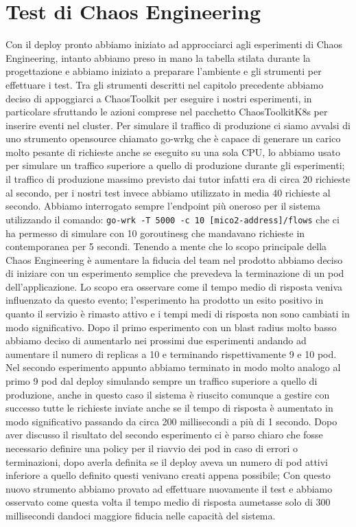 \section{Test di Chaos Engineering}
Con il deploy pronto abbiamo iniziato ad approcciarci agli esperimenti di Chaos Engineering, intanto abbiamo preso in mano la tabella stilata durante la progettazione e abbiamo iniziato a preparare l'ambiente e gli strumenti per effettuare i test.
Tra gli strumenti descritti nel capitolo precedente abbiamo deciso di appoggiarci a ChaosToolkit per eseguire i nostri esperimenti, in particolare sfruttando le azioni comprese nel pacchetto ChaosToolkitK8s per inserire eventi nel cluster.
Per simulare il traffico di produzione ci siamo avvalsi di uno strumento opensource chiamato \gls{go-wrkg} che è capace di generare un carico molto pesante di richieste anche se eseguito su una sola CPU, lo abbiamo usato per simulare un traffico superiore a quello di produzione durante gli esperimenti; il traffico di produzione massimo previsto dai tutor infatti era di circa 20 richieste al secondo, per i nostri test invece abbiamo utilizzato in media 40 richieste al secondo.
Abbiamo interrogato sempre l'endpoint più oneroso per il sistema utilizzando il comando:
\texttt{go-wrk -T 5000 -c 10 [mico2-address]/flows}
che ci ha permesso di simulare con 10 \gls{goroutinesg} che mandavano richieste in contemporanea per 5 secondi.
Tenendo a mente che lo scopo principale della Chaos Engineering è aumentare la fiducia del team nel prodotto abbiamo deciso di iniziare con un esperimento semplice che prevedeva la terminazione di un pod dell'applicazione.
Lo scopo era osservare come il tempo medio di risposta veniva influenzato da questo evento; l'esperimento ha prodotto un esito positivo in quanto il servizio è rimasto attivo e i tempi medi di risposta non sono cambiati in modo significativo.
Dopo il primo esperimento con un blast radius molto basso abbiamo deciso di aumentarlo nei prossimi due esperimenti andando ad aumentare il numero di replicas a 10 e terminando rispettivamente 9 e 10 pod.
Nel secondo esperimento appunto abbiamo terminato in modo molto analogo al primo 9 pod dal deploy simulando sempre un traffico superiore a quello di produzione, anche in questo caso il sistema è riuscito comunque a gestire con successo tutte le richieste inviate anche se il tempo di risposta è aumentato in modo significativo passando da circa 200 millisecondi a più di 1 secondo.
Dopo aver discusso il risultato del secondo esperimento ci è parso chiaro che fosse necessario definire una policy per il riavvio dei pod in caso di errori o terminazioni, dopo averla definita se il deploy aveva un numero di pod attivi inferiore a quello definito questi venivano creati appena possibile; Con questo nuovo strumento abbiamo provato ad effettuare nuovamente il test e abbiamo osservato come questa volta il tempo medio di risposta aumetasse solo di 300 millisecondi dandoci maggiore fiducia nelle capacità del sistema.

